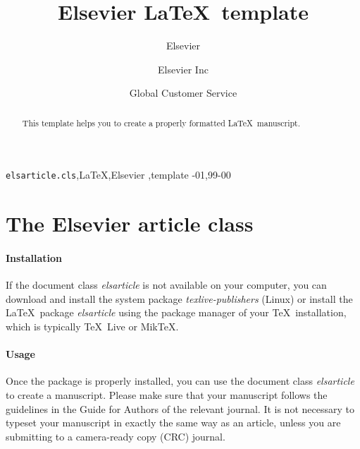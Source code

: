 \documentclass[review,fleqn]{elsarticle}
\begin{document}
\begin{frontmatter}

\title{Elsevier \LaTeX\ template}

\author{Elsevier}
\address{Radarweg 29, Amsterdam}

\author[mymainaddress,mysecondaryaddress]{Elsevier Inc}

\author[mysecondaryaddress]{Global Customer Service}

\address[mymainaddress]{1600 John F Kennedy Boulevard, Philadelphia}
\address[mysecondaryaddress]{360 Park Avenue South, New York}

\begin{abstract}
This template helps you to create a properly formatted \LaTeX\ manuscript.
\end{abstract}

\begin{keyword}
\texttt{elsarticle.cls}\sep \LaTeX\sep Elsevier \sep template
-01\sep  99-00
\end{keyword}

\end{frontmatter}

\linenumbers

\section{The Elsevier article class}

\paragraph{Installation} If the document class \emph{elsarticle} is not available on your computer, you can download and install the system package \emph{texlive-publishers} (Linux) or install the \LaTeX\ package \emph{elsarticle} using the package manager of your \TeX\ installation, which is typically \TeX\ Live or Mik\TeX.

\paragraph{Usage} Once the package is properly installed, you can use the document class \emph{elsarticle} to create a manuscript. Please make sure that your manuscript follows the guidelines in the Guide for Authors of the relevant journal. It is not necessary to typeset your manuscript in exactly the same way as an article, unless you are submitting to a camera-ready copy (CRC) journal.
\end{document}
